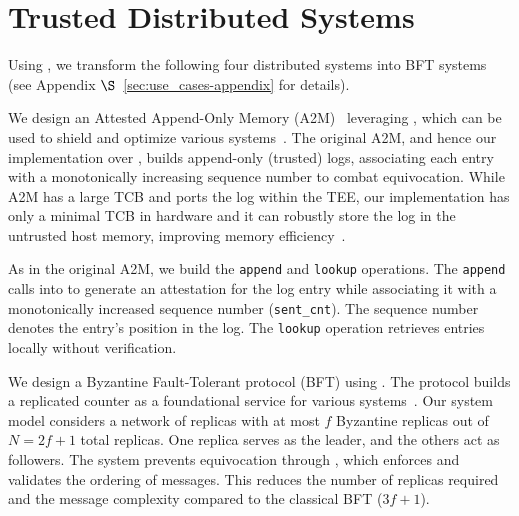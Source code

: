 \section{Trusted Distributed Systems}
\label{sec:use_cases}


Using \projecttitle{}, we transform the following four distributed systems into BFT systems (see Appendix $\S$~\ref{sec:use_cases-appendix} for details).  


 We design an Attested Append-Only Memory (A2M)~\cite{A2M} leveraging \projecttitle{}, which can be used to shield and optimize various systems~\cite{AbdElMalek2005FaultscalableBF, Castro:2002, Li2004, 10.5555/1298455.1298473}. The original A2M, and hence our implementation over \projecttitle{}, builds append-only (trusted) logs, associating each entry with a monotonically increasing sequence number to combat equivocation. While A2M has a large TCB and ports the log within the TEE, our implementation has only a minimal TCB in hardware and it can robustly store the log in the untrusted host memory, improving memory efficiency~\cite{levin2009trinc}.

As in the original A2M, we build the \texttt{append} and \texttt{lookup} operations. The \texttt{append} calls into  \projecttitle{} to generate an attestation for the log entry while associating it with a monotonically increased sequence number ({\tt sent\_cnt}). The sequence number denotes the entry's position in the log. The \texttt{lookup} operation retrieves entries locally without verification.


We design a Byzantine Fault-Tolerant protocol (BFT) using \projecttitle{}. The protocol builds a replicated counter as a foundational service for various systems~\cite{rafthyperledger, Kafka, boki, 10.1145/3286685.3286686, scalog}. Our system model considers a network of replicas with at most $f$ Byzantine replicas out of $N=2f+1$ total replicas. One replica serves as the leader, and the others act as followers. 
The system prevents equivocation through \projecttitle{}, which enforces and validates the ordering of messages. This reduces the number of replicas required and the message complexity compared to the classical BFT ($3f+1$).

